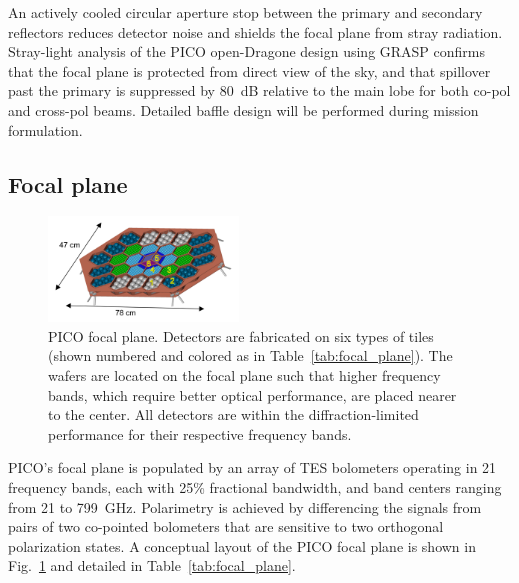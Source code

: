 An actively cooled circular aperture stop between the primary and secondary reflectors reduces detector noise and shields the focal plane from stray radiation. Stray-light analysis of the PICO open-Dragone design using GRASP confirms that the focal plane is protected from direct view of the sky, and that spillover past the primary is suppressed by 80~dB relative to the main lobe for both co-pol and cross-pol beams. Detailed baffle design will be performed during mission formulation.



\subsection{Focal plane}
\label{sec:focal_plane} %
%
\begin{figure}
\vskip -8pt
\hfill
\includegraphics[width=0.45\textwidth]{figures/FocalPlaneMechanical.png}
\vskip -2pt
\caption{\captiontext PICO focal plane. Detectors are fabricated on six types of tiles (shown numbered and colored as in Table~\ref{tab:focal_plane}). The wafers are located on the focal plane such that higher frequency bands, which require better optical performance, are placed nearer to the center. All detectors are within the diffraction-limited performance for their respective frequency bands.  
\label{fig:FocalPlaneMechanical}}
\end{figure}


PICO's focal plane is populated by an %
array of \ac{TES} bolometers operating in 21 %
frequency bands, each with 25\% fractional bandwidth, and band centers ranging from 21 to 799~GHz.
Polarimetry is achieved by differencing the signals from pairs of two co-pointed bolometers that are sensitive to two orthogonal polarization states. %
A conceptual layout of the PICO focal plane is shown in Fig.~\ref{fig:FocalPlaneMechanical} and detailed in Table~\ref{tab:focal_plane}.

